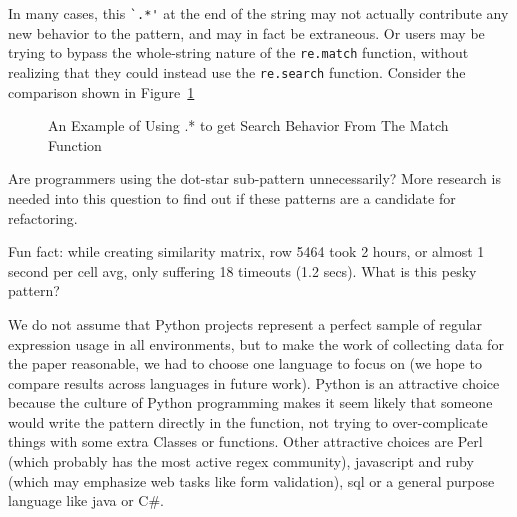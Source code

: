 In many cases, this \verb!`.*'! at the end of the string may not actually contribute any new behavior to the pattern, and may in fact be extraneous.  Or users may be trying to bypass the whole-string nature of the {\tt re.match} function, without realizing that they could instead use the {\tt re.search} function.  Consider the comparison shown in Figure~\ref{fig:searchVSmatch}

\begin{figure}[tb]
\centering
{}
\caption{An Example of Using .* to get Search Behavior From The Match Function}
\label{fig:searchVSmatch}
\end{figure}

Are programmers using the dot-star sub-pattern unnecessarily? More research is needed into this question to find out if these patterns are a candidate for refactoring.






Fun fact: while creating similarity matrix, row 5464 took 2 hours, or almost 1 second per cell avg, only suffering 18 timeouts (1.2 secs).  What is this pesky pattern?

We do not assume that Python projects represent a perfect sample of regular expression usage in all environments, but to make the work of collecting data for the paper reasonable, we had to choose one language to focus on (we hope to compare results across languages in future work).  Python is an attractive choice because the culture of Python programming makes it seem likely that someone would write the pattern directly in the function, not trying to over-complicate things with some extra Classes or functions.  Other attractive choices are Perl (which probably has the most active regex community), javascript and ruby (which may emphasize web tasks like form validation), sql or a general purpose language like java or C\#.








